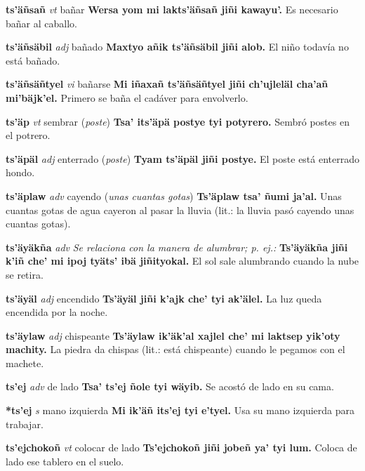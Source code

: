 \documentclass[10pt]{scrbook}
\newcommand{\entry}[1]{\textbf{#1}}
\newcommand{\nontranslationdef}[1]{\textit{#1}}
\newcommand{\partofspeech}[1]{\textit{#1}}
\newcommand{\spanishtranslation}[1]{#1}
\newcommand{\clarification}[1]{(\textit{#1})}
\newcommand{\cholexample}[1]{\textbf{#1}}
\newcommand{\exampletranslation}[1]{#1}
\begin{document}
\begin{multicols}{2}
\entry{ts'äñsañ}
\partofspeech{vt}
\spanishtranslation{bañar}
\cholexample{Wersa yom mi lakts'äñsañ jiñi kawayu'.}
\exampletranslation{Es necesario bañar al caballo.}

\entry{ts'äñsäbil}
\partofspeech{adj}
\spanishtranslation{bañado}
\cholexample{Maxtyo añik ts'äñsäbil jiñi alob.}
\exampletranslation{El niño todavía no está bañado.}

\entry{ts'äñsäñtyel}
\partofspeech{vi}
\spanishtranslation{bañarse}
\cholexample{Mi iñaxañ ts'äñsäñtyel jiñi ch'ujleläl cha'añ mi'bäjk'el.}
\exampletranslation{Primero se baña el cadáver para envolverlo.}

\entry{ts'äp}
\partofspeech{vt}
\spanishtranslation{sembrar}
\clarification{poste}
\cholexample{Tsa' its'äpä postye tyi potyrero.}
\exampletranslation{Sembró postes en el potrero.}

\entry{ts'äpäl}
\partofspeech{adj}
\spanishtranslation{enterrado}
\clarification{poste}
\cholexample{Tyam ts'äpäl jiñi postye.}
\exampletranslation{El poste está enterrado hondo.}

\entry{ts'äplaw}
\partofspeech{adv}
\spanishtranslation{cayendo}
\clarification{unas cuantas gotas}
\cholexample{Ts'äplaw tsa' ñumi ja'al.}
\exampletranslation{Unas cuantas gotas de agua cayeron al pasar la lluvia (lit.: la lluvia pasó cayendo unas cuantas gotas).}

\entry{ts'äyäkña}
\partofspeech{adv}
\nontranslationdef{Se relaciona con la manera de alumbrar; p. ej.:}
\cholexample{Ts'äyäkña jiñi k'iñ che' mi ipoj tyäts' ibä jiñityokal.}
\exampletranslation{El sol sale alumbrando cuando la nube se retira.}

\entry{ts'äyäl}
\partofspeech{adj}
\spanishtranslation{encendido}
\cholexample{Ts'äyäl jiñi k'ajk che' tyi ak'älel.}
\exampletranslation{La luz queda encendida por la noche.}

\entry{ts'äylaw}
\partofspeech{adj}
\spanishtranslation{chispeante}
\cholexample{Ts'äylaw ik'äk'al xajlel che' mi laktsep yik'oty machity.}
\exampletranslation{La piedra da chispas (lit.: está chispeante) cuando le pegamos con el machete.}

\entry{ts'ej}
\partofspeech{adv}
\spanishtranslation{de lado}
\cholexample{Tsa' ts'ej ñole tyi wäyib.}
\exampletranslation{Se acostó de lado en su cama.}

\entry{*ts'ej}
\partofspeech{s}
\spanishtranslation{mano izquierda}
\cholexample{Mi ik'äñ its'ej tyi e'tyel.}
\exampletranslation{Usa su mano izquierda para trabajar.}

\entry{ts'ejchokoñ}
\partofspeech{vt}
\spanishtranslation{colocar de lado}
\cholexample{Ts'ejchokoñ jiñi jobeñ ya' tyi lum.}
\exampletranslation{Coloca de lado ese tablero en el suelo.}


\end{multicols}
\end{document}
